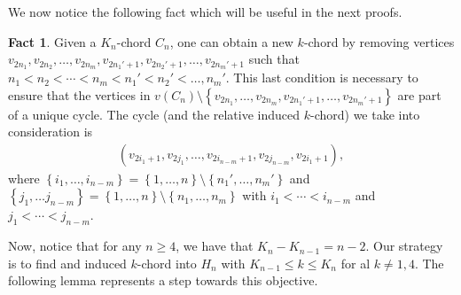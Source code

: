 \documentclass[12pt]{article}
\theoremstyle{definition}
\newtheorem{fact}[thm]{Fact}
\begin{document}
    We now notice the following fact
    which will be useful in the next proofs.

    \begin{fact} \label{fact:new}
        Given a $K_{n}$-chord 
        $C_{n}$, one can obtain
        a new $k$-chord by removing
        vertices $v_{2n_1}, 
        v_{2n_2}, \ldots,
        v_{2n_{m}}, v_{2n_1'+1}, 
        v_{2n_2'+1}, \ldots,
        v_{2n_{m}' + 1}$
        such that
        $n_1 < n_2 < \cdots
        < n_{m} < n_1' < n_2'
        < \ldots, n_{m}'$.
        This last condition is
        necessary to ensure that 
        the vertices in $v\left(C_{n}\right)
        \setminus \left\{
        v_{2n_1}, \ldots, 
        v_{2n_{m}},
        v_{2n_1'+1}, \ldots,
        v_{2n_{m}'+1}\right\}$
        are part of a unique cycle.
        The cycle (and the relative
        induced $k$-chord)
        we take into consideration is
        \begin{gather*}
            \left(v_{2i_1 + 1}, 
            v_{2j_1}, \ldots,
            v_{2i_{n-m}+1},
            v_{2j_{n-m}},
            v_{2i_1 + 1}\right),
        \end{gather*}
        where 
        $\left\{i_1, \ldots, i_{n-m}\right\} =
        \left\{1, \ldots, n\right\} \setminus 
        \left\{n_1', \ldots, n_{m}'\right\}$
        and
        $\left\{j_1, \ldots j_{n-m}\right\}
        = \left\{1, \ldots, n\right\}
        \setminus \left\{n_1, \ldots, n_{m}\right\}$ 
        with $i_1 < \cdots < i_{n-m}$
        and
        $j_1 < \cdots < j_{n-m}$.
    \end{fact}
    
    Now, notice that for any
    $n \geq 4$, we have that
    $K_{n} - K_{n-1} = n-2$.
    Our strategy is to find
    and induced $k$-chord
    into $H_{n}$ with
    $K_{n-1} \leq k \leq K_{n}$ 
    for al $k \neq 1,4$.
    The following lemma
    represents a step towards 
    this objective.
\end{document}
